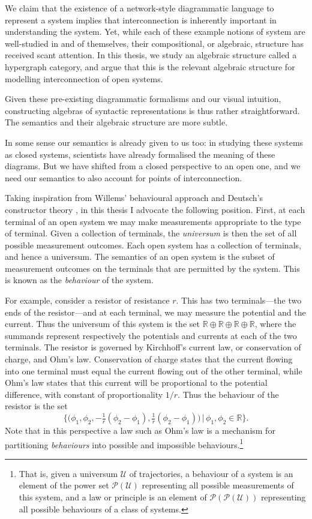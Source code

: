 We claim that the existence of a network-style diagrammatic language to
represent a system implies that interconnection is inherently important in
understanding the system. Yet, while each of these example notions of system are
well-studied in and of themselves, their compositional, or algebraic, structure
has received scant attention. In this thesis, we study an algebraic structure
called a hypergraph category, and argue that this is the relevant algebraic
structure for modelling interconnection of open systems. 

Given these pre-existing diagrammatic formalisms and our visual intuition,
constructing algebras of syntactic representations is thus rather
straightforward. The semantics and their algebraic structure are more subtle. 

In some sense our semantics is already given to us too: in studying these
systems as closed systems, scientists have already formalised the meaning of
these diagrams. But we have shifted from a closed perspective to an open one,
and we need our semantics to also account for points of interconnection.

Taking inspiration from Willems' behavioural approach \cite{Wi} and Deutsch's
constructor theory \cite{Deu}, in this thesis I advocate the following position.
First, at each terminal of an open system we may make measurements appropriate
to the type of terminal. Given a collection of terminals, the \emph{universum}
is then the set of all possible measurement outcomes. Each open system has a
collection of terminals, and hence a universum. The semantics of an open system
is the subset of measurement outcomes on the terminals that are permitted by the
system. This is known as the \emph{behaviour} of the system.

For example, consider a resistor of resistance $r$. This has two terminals---the
two ends of the resistor---and at each terminal, we may measure the potential
and the current. Thus the universum of this system is the set
$\mathbb{R}\oplus\mathbb{R}\oplus\mathbb{R}\oplus\mathbb{R}$, where the summands
represent respectively the potentials and currents at each of the two terminals.
The resistor is governed by Kirchhoff's current law, or conservation of charge,
and Ohm's law.  Conservation of charge states that the current flowing into one
terminal must equal the current flowing out of the other terminal, while Ohm's
law states that this current will be proportional to the potential difference,
with constant of proportionality $1/r$. Thus the behaviour of the resistor is
the set 
\[
  \big\{\big(\phi_1,\phi_2,
    -\tfrac1r(\phi_2-\phi_1),\tfrac1r(\phi_2-\phi_1)\big)\,\big\vert\,
    \phi_1,\phi_2 \in \mathbb{R}\big\}.
\]
Note that in this perspective a law such as Ohm's law is a mechanism for
partitioning \emph{behaviours} into possible and impossible
behaviours.\footnote{That is, given a universum $\mathcal U$ of trajectories, a
  behaviour of a system is an element of the power set $\mathcal P(\mathcal
U)$ representing all possible measurements of this system, and a law or principle
is an element of $\mathcal P(\mathcal P(\mathcal U))$ representing all possible
behaviours of a class of systems.}

